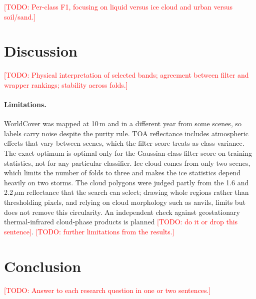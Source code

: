 \documentclass[11pt]{article}
\newcommand{\todo}[1]{\textnormal{\textcolor{red}{[TODO: #1]}}}
\newcommand{\um}{\,\ensuremath{\mu}m}
\begin{document}

\todo{Per-class F1, focusing on liquid versus ice cloud and urban versus
soil/sand.}

\section{Discussion}
\todo{Physical interpretation of selected bands; agreement between filter and
wrapper rankings; stability across folds.}

\paragraph{Limitations.} WorldCover was mapped at 10\,m and in a different year
from some scenes, so labels carry noise despite the purity rule. TOA
reflectance includes atmospheric effects that vary between scenes, which the
filter score treats as class variance. The exact optimum is optimal only for
the Gaussian-class filter score on training statistics, not for any particular
classifier. Ice cloud comes from only two scenes, which limits the number of
folds to three and makes the ice statistics depend heavily on two storms. The
cloud polygons were judged partly from the 1.6 and 2.2\um{} reflectance that
the search can select; drawing whole regions rather than thresholding pixels,
and relying on cloud morphology such as anvils, limits but does not remove
this circularity. An independent check against geostationary thermal-infrared
cloud-phase products is planned \todo{do it or drop this sentence}.
\todo{further limitations from the results.}

\section{Conclusion}
\todo{Answer to each research question in one or two sentences.}



\end{document}
